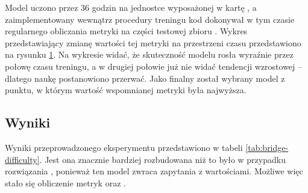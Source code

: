 \begin{figure}[ht!]
  \begin{center}
    \label{plot:bridge-accuracy}
  \end{center}
\end{figure}

Model uczono przez 36 godzin na jednostce wyposażonej w kartę , a zaimplementowany wewnątrz procedury treningu kod dokonywał w tym czasie regularnego obliczania metryki  na części testowej zbioru . Wykres przedstawiający zmianę wartości tej metryki na przestrzeni czasu przedstawiono na rysunku \ref{plot:bridge-accuracy}. Na wykresie widać, że skuteczność modelu rosła wyraźnie przez połowę czasu treningu, a w drugiej połowie już nie widać tendencji wzrostowej -- dlatego naukę postanowiono przerwać. Jako finalny został wybrany model z punktu, w którym wartość wspomnianej metryki była najwyższa.

\subsection{Wyniki}
Wyniki przeprowadzonego eksperymentu przedstawiono w tabeli \ref{tab:bridge-difficulty}. Jest ona znacznie bardziej rozbudowana niż to było w przypadku rozwiązania , ponieważ ten model zwraca zapytania z wartościami. Możliwe więc stało się obliczenie metryk  oraz .

